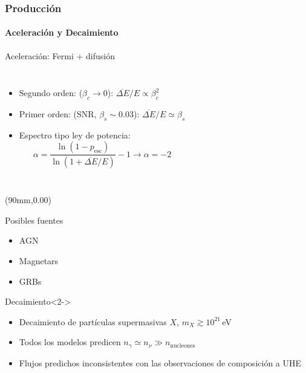 \documentclass[xetex,mathserif,serif,10pt]{beamer}
\begin{document}
\begin{frame}
	\frametitle{Producción}
	\framesubtitle{Aceleración y Decaimiento}
	\begin{exampleblock}{Aceleración: Fermi + difusión}
		\begin{columns}
			\begin{itemize}
				\item Segundo orden: ($\beta_c \to 0$): $\overline{\Delta E}/E \propto \beta_c^2$
				\item Primer orden: (SNR, $\beta_s \sim 0.03$): $\overline{\Delta E}/E \simeq \beta_s$
				\item Espectro tipo ley de potencia:
					\begin{equation*}
					\alpha = \frac{\ln (1-p_\mathrm{esc})}{\ln \left (1 + \overline{\Delta E}/E \right)} -1 \to \alpha = -2
				\end{equation*}
		\end{itemize}
	\end{columns}
\end{exampleblock}

\begin{textblock*}{35mm}(90mm,0.00\textheight)
	\begin{alertblock}{Posibles fuentes}
		\begin{itemize}
			\item AGN
			\item Magnetars
			\item GRBs
		\end{itemize}
	\end{alertblock}
\end{textblock*}
\begin{block}{Decaimiento}<2->
	\begin{itemize}
		\item Decaimiento de partículas supermasivas $X$, $m_X \gtrsim 10^{21}$\,eV
		\item Todos los modelos predicen $n_\gamma \simeq n_\nu \gg n_{\mathrm{nucleones}}$
		\item Flujos predichos inconsistentes con las observaciones de composición a UHE
	\end{itemize}
\end{block}

\end{frame}
\end{document}
